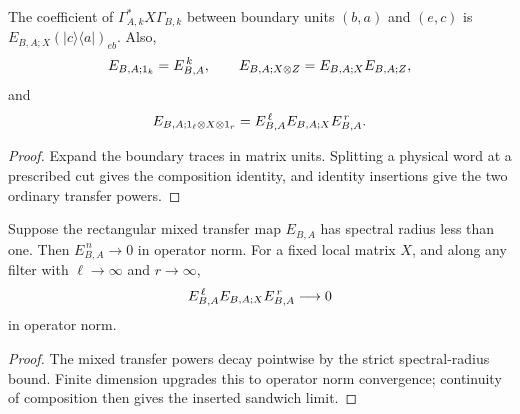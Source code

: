\begin{lemma}
    \label{thm:mixed_observable_insertion_identities}
    \leanok
    The coefficient of $\Gamma_{A,k}^*X\Gamma_{B,k}$ between boundary units
    $(b,a)$ and $(e,c)$ is $E_{B,A;X}(|c\rangle\langle a|)_{eb}$.
    Also,
    \begin{align}
        E_{B,A;1_k}=E_{B,A}^{\,k},\qquad
        E_{B,A;X\otimes Z}=E_{B,A;X}E_{B,A;Z},
        \notag
    \end{align}
    and
    \begin{align}
        E_{B,A;1_\ell\otimes X\otimes1_r}
        =E_{B,A}^{\,\ell}E_{B,A;X}E_{B,A}^{\,r}.
        \notag
    \end{align}
\end{lemma}
\begin{proof}\leanok
    Expand the boundary traces in matrix units. Splitting a physical word at a
    prescribed cut gives the composition identity, and identity insertions give
    the two ordinary transfer powers.
\end{proof}

\begin{lemma}
    \label{thm:mixed_observable_sandwich_decay}
    \leanok
    Suppose the rectangular mixed transfer map $E_{B,A}$ has spectral radius less
    than one. Then $E_{B,A}^{\,n}\to0$ in operator norm. For a fixed local matrix
    $X$, and along any filter with $\ell\to\infty$ and $r\to\infty$,
    \begin{align}
        E_{B,A}^{\,\ell}E_{B,A;X}E_{B,A}^{\,r}\longrightarrow0
        \notag
    \end{align}
    in operator norm.
\end{lemma}
\begin{proof}\leanok
    The mixed transfer powers decay pointwise by the strict spectral-radius
    bound. Finite dimension upgrades this to operator norm convergence;
    continuity of composition then gives the inserted sandwich limit.
\end{proof}

